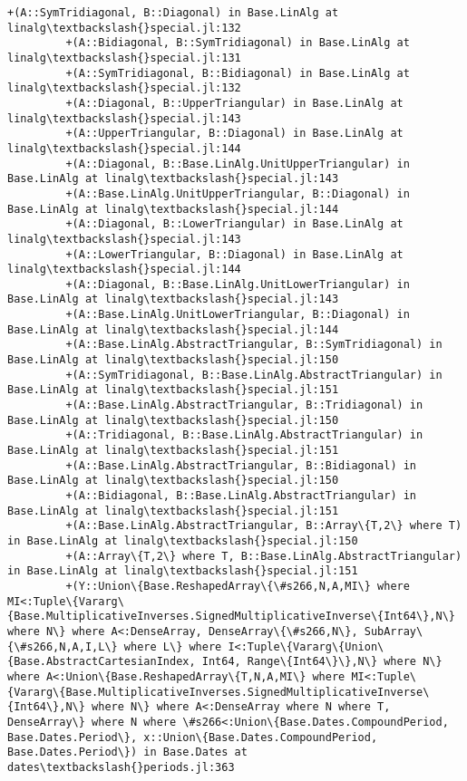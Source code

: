 \documentclass[11pt]{article}
\begin{document}
\begin{Verbatim}[commandchars=\\\{\}]
         +(A::SymTridiagonal, B::Diagonal) in Base.LinAlg at linalg\textbackslash{}special.jl:132
         +(A::Bidiagonal, B::SymTridiagonal) in Base.LinAlg at linalg\textbackslash{}special.jl:131
         +(A::SymTridiagonal, B::Bidiagonal) in Base.LinAlg at linalg\textbackslash{}special.jl:132
         +(A::Diagonal, B::UpperTriangular) in Base.LinAlg at linalg\textbackslash{}special.jl:143
         +(A::UpperTriangular, B::Diagonal) in Base.LinAlg at linalg\textbackslash{}special.jl:144
         +(A::Diagonal, B::Base.LinAlg.UnitUpperTriangular) in Base.LinAlg at linalg\textbackslash{}special.jl:143
         +(A::Base.LinAlg.UnitUpperTriangular, B::Diagonal) in Base.LinAlg at linalg\textbackslash{}special.jl:144
         +(A::Diagonal, B::LowerTriangular) in Base.LinAlg at linalg\textbackslash{}special.jl:143
         +(A::LowerTriangular, B::Diagonal) in Base.LinAlg at linalg\textbackslash{}special.jl:144
         +(A::Diagonal, B::Base.LinAlg.UnitLowerTriangular) in Base.LinAlg at linalg\textbackslash{}special.jl:143
         +(A::Base.LinAlg.UnitLowerTriangular, B::Diagonal) in Base.LinAlg at linalg\textbackslash{}special.jl:144
         +(A::Base.LinAlg.AbstractTriangular, B::SymTridiagonal) in Base.LinAlg at linalg\textbackslash{}special.jl:150
         +(A::SymTridiagonal, B::Base.LinAlg.AbstractTriangular) in Base.LinAlg at linalg\textbackslash{}special.jl:151
         +(A::Base.LinAlg.AbstractTriangular, B::Tridiagonal) in Base.LinAlg at linalg\textbackslash{}special.jl:150
         +(A::Tridiagonal, B::Base.LinAlg.AbstractTriangular) in Base.LinAlg at linalg\textbackslash{}special.jl:151
         +(A::Base.LinAlg.AbstractTriangular, B::Bidiagonal) in Base.LinAlg at linalg\textbackslash{}special.jl:150
         +(A::Bidiagonal, B::Base.LinAlg.AbstractTriangular) in Base.LinAlg at linalg\textbackslash{}special.jl:151
         +(A::Base.LinAlg.AbstractTriangular, B::Array\{T,2\} where T) in Base.LinAlg at linalg\textbackslash{}special.jl:150
         +(A::Array\{T,2\} where T, B::Base.LinAlg.AbstractTriangular) in Base.LinAlg at linalg\textbackslash{}special.jl:151
         +(Y::Union\{Base.ReshapedArray\{\#s266,N,A,MI\} where MI<:Tuple\{Vararg\{Base.MultiplicativeInverses.SignedMultiplicativeInverse\{Int64\},N\} where N\} where A<:DenseArray, DenseArray\{\#s266,N\}, SubArray\{\#s266,N,A,I,L\} where L\} where I<:Tuple\{Vararg\{Union\{Base.AbstractCartesianIndex, Int64, Range\{Int64\}\},N\} where N\} where A<:Union\{Base.ReshapedArray\{T,N,A,MI\} where MI<:Tuple\{Vararg\{Base.MultiplicativeInverses.SignedMultiplicativeInverse\{Int64\},N\} where N\} where A<:DenseArray where N where T, DenseArray\} where N where \#s266<:Union\{Base.Dates.CompoundPeriod, Base.Dates.Period\}, x::Union\{Base.Dates.CompoundPeriod, Base.Dates.Period\}) in Base.Dates at dates\textbackslash{}periods.jl:363

\end{Verbatim}
\end{document}
